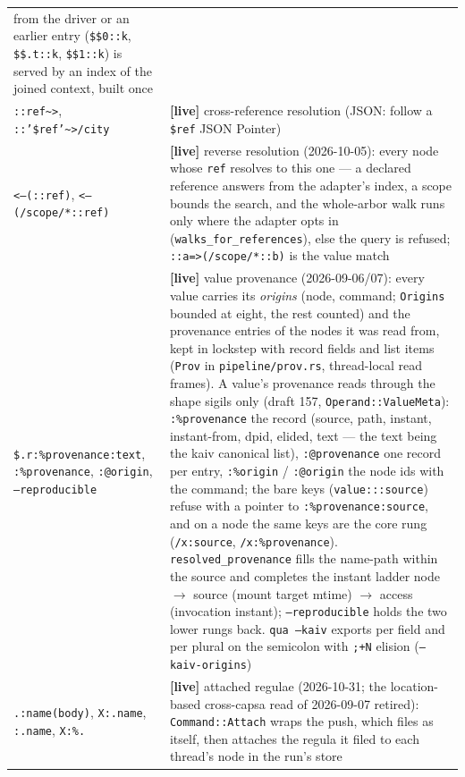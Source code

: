 \documentclass{report}
\newcommand{\live}{\textbf{\textcolor{blue!60!black}{[live]}}\xspace}
\begin{document}
\begin{xltabular}{\textwidth}{>{\raggedright\arraybackslash}p{0.36\textwidth} X}
    from the driver or an earlier entry (\texttt{\$\$0::k},
    \texttt{\$\$.t::k}, \texttt{\$\$1::k}) is served by an index
    of the joined context, built once \\
\texttt{::ref\textasciitilde>}, \texttt{::'\$ref'\textasciitilde>/city}
  & \live cross-reference resolution (JSON: follow a \texttt{\$ref}
    JSON Pointer) \\
\texttt{<--(::ref)}, \texttt{<--(/scope/*::ref)}
  & \live reverse resolution (2026-10-05): every node whose
    \texttt{ref} resolves to this one — a declared reference
    answers from the adapter's index, a scope bounds the search,
    and the whole-arbor walk runs only where the adapter opts in
    (\texttt{walks\_for\_references}), else the query is refused;
    \texttt{::a=>(/scope/*::b)} is the value match \\
\texttt{\$.r:\%provenance:text}, \texttt{:\%provenance},
\texttt{:@origin}, \texttt{--reproducible}
  & \live value provenance (2026-09-06/07): every value carries
    its \emph{origins} (node, command; \texttt{Origins} bounded at
    eight, the rest counted) and the provenance entries of the
    nodes it was read from, kept in lockstep with record fields and
    list items (\texttt{Prov} in \texttt{pipeline/prov.rs}, thread-local
    read frames). A value's provenance reads through the shape
    sigils only (draft 157, \texttt{Operand::ValueMeta}):
    \texttt{:\%provenance} the record (source, path, instant,
    instant-from, dpid, elided, text — the text being the kaiv
    canonical list), \texttt{:@provenance} one record per entry,
    \texttt{:\%origin} / \texttt{:@origin} the node ids with the
    command; the bare keys (\texttt{value:::source}) refuse with a
    pointer to \texttt{:\%provenance:source}, and on a node the same
    keys are the core rung (\texttt{/x:source},
    \texttt{/x:\%provenance}). \texttt{resolved\_provenance} fills the
    name-path within the source and completes the instant ladder
    node $\to$ source (mount target mtime) $\to$ access
    (invocation instant); \texttt{--reproducible} holds the two
    lower rungs back. \texttt{qua --kaiv} exports per field and
    per plural on the semicolon with \texttt{;+N} elision
    (\texttt{--kaiv-origins}) \\
\texttt{.:name(body)}, \texttt{X:.name}, \texttt{:.name}, \texttt{X:\%.}
  & \live attached regulae (2026-10-31; the location-based
    cross-capsa read of 2026-09-07 retired): \texttt{Command::Attach}
    wraps the push, which files as itself, then attaches the regula
    it filed to each thread's node in the run's store

\end{xltabular}
\end{document}
